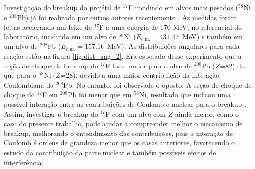 \documentclass[a4paper,12pt,oneside]{book}
\begin{document}
\par Investigação do breakup do projétil de $^{17}$F incidindo em alvos mais pesados ($^{58}$Ni e $^{208}$Pb) já foi realizada por outros autores recentemente \cite{LIANG200922}. As medidas foram feitas acelerando um feixe de $^{17}$F a uma energia de 170 MeV, no referencial do laboratório, incidindo em um alvo de $^{58}$Ni ($E_\mathrm{c.m.} = 131.47$~MeV) e também em um alvo de $^{208}$Pb ($E_\mathrm{c.m.} = 157.16$~MeV). As distribuições angulares para cada reação estão na figura \ref{fig:dist_ang_2}. Era esperado desse experimento que a seção de choque de breakup do $^{17}$F fosse maior para o alvo de $^{208}$Pb ($Z$=82) do que para o $^{58}$Ni ($Z$=28), devido a uma maior contribuição da interação Coulombiana do $^{208}$Pb. No entanto, foi observado o oposto. A seção de choque de choque do $^{17}$F em $^{208}$Pb foi menor que em $^{58}$Ni, resultado que indicou uma possível interação entre as contribuições de Coulomb e nuclear para o breakup \cite{LIANG200922, MORO_BREAKUP}. Assim, investigar o breakup do $^{17}$F com  um alvo com $Z$ ainda menor, como o caso do presente trabalho, pode ajudar a compreender melhor o mecanismo de breakup, melhorando o entendimento das contribuições, pois a interação de Coulomb é ordens de grandeza menor que os casos anteriores, favorecendo o estudo da contribuição da parte nuclear e também possíveis efeitos de interferência. 
\end{document}
